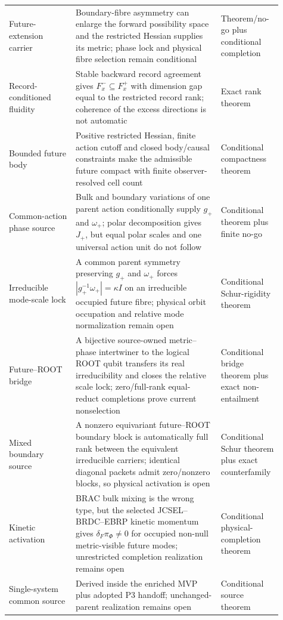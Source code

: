\documentclass[11pt]{article}
\begin{document}
\begin{longtable}{@{}>{\raggedright\arraybackslash}p{0.23\linewidth}>{\raggedright\arraybackslash}p{0.50\linewidth}>{\raggedright\arraybackslash}p{0.18\linewidth}@{}}
Future-extension carrier & Boundary-fibre asymmetry can enlarge the forward
possibility space and the restricted Hessian supplies its metric; phase lock
and physical fibre selection remain conditional & Theorem/no-go plus
conditional completion \\
Record-conditioned fluidity & Stable backward record agreement gives
$F_x^-\subseteq F_x^+$ with dimension gap equal to the restricted record rank;
coherence of the excess directions is not automatic & Exact rank theorem \\
Bounded future body & Positive restricted Hessian, finite action cutoff and
closed body/causal constraints make the admissible future compact with finite
observer-resolved cell count & Conditional compactness theorem \\
Common-action phase source & Bulk and boundary variations of one parent action
conditionally supply $g_+$ and $\omega_+$; polar decomposition gives $J_+$,
but equal polar scales and one universal action unit do not follow &
Conditional theorem plus finite no-go \\
Irreducible mode-scale lock & A common parent symmetry preserving $g_+$ and
$\omega_+$ forces $|g_+^{-1}\omega_+|=\kappa I$ on an irreducible occupied
future fibre; physical orbit occupation and relative mode normalization remain open
& Conditional Schur-rigidity theorem \\
Future--ROOT bridge & A bijective source-owned metric--phase intertwiner to the
logical ROOT qubit transfers its real irreducibility and closes the relative
scale lock; zero/full-rank equal-reduct completions prove current nonselection
& Conditional bridge theorem plus exact non-entailment \\
Mixed boundary source & A nonzero equivariant future--ROOT boundary block is
automatically full rank between the equivalent irreducible carriers; identical
diagonal packets admit zero/nonzero blocks, so physical activation is open &
Conditional Schur theorem plus exact counterfamily \\
Kinetic activation & BRAC bulk mixing is the wrong type, but the selected
JCSEL--BRDC--EBRP kinetic momentum gives $\delta_F\pi_\Phi\neq0$ for occupied
non-null metric-visible future modes; unrestricted completion realization remains
open & Conditional physical-completion theorem \\
Single-system common source & Derived inside the enriched MVP plus adopted
P3 handoff; unchanged-parent realization remains open & Conditional source
theorem \\

\end{longtable}
\end{document}
